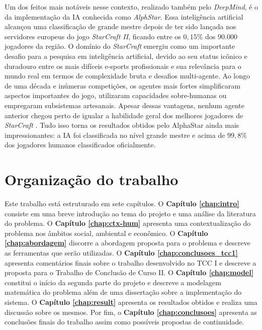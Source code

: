 Um dos feitos mais notáveis nesse contexto, realizado também pelo \textit{DeepMind}, é o da implementação da IA conhecida como \textit{AlphStar}. Essa inteligência artificial alcançou uma classificação de grande mestre depois de ter sido lançada nos servidores europeus do jogo \textit{StarCraft II}, ficando entre os $0,15\%$ dos 90.000 jogadores da região. O domínio do \textit{StarCraft} emergiu como um importante desafio para a pesquisa em inteligência artificial, devido ao seu status icônico e duradouro entre os mais difíceis e-sports profissionais e sua relevância para o mundo real em termos de complexidade bruta e desafios multi-agente. Ao longo de uma década e inúmeras competições, os agentes mais fortes simplificaram aspectos importantes do jogo, utilizaram capacidades sobre-humanas ou empregaram subsistemas artesanais. Apesar dessas vantagens, nenhum agente anterior chegou perto de igualar a habilidade geral dos melhores jogadores de \textit{StarCraft} \cite{vinyals:gm-lv-starcraft}. Tudo isso torna os resultados obtidos pelo AlphaStar ainda mais impressionantes: a IA foi classificada no nível grande mestre e acima de $99,8\%$ dos jogadores humanos classificados oficialmente.




\section{Organização do trabalho} %
\label{sec:organização_do_trabalho}
Este trabalho está estruturado em sete capítulos. O \textbf{Capítulo \ref{chap:intro}} consiste em uma breve introdução ao tema do projeto e uma análise da literatura do problema. O \textbf{Capítulo \ref{chap:ctx-hum}} apresenta uma contextualização do problema nos âmbitos social, ambiental e econômico. O \textbf{Capítulo \ref{chap:abordagem}} discorre a abordagem proposta para o problema e descreve as ferramentas que serão utilizadas. 
O \textbf{Capítulo \ref{chap:conclusoes_tcc1}} apresenta comentários finais sobre o trabalho desenvolvido no TCC I e descreve a proposta para o Trabalho de Conclusão de Curso II. 
O \textbf{Capítulo \ref{chap:model}} constitui o início da segunda parte do projeto e descreve a modelagem matemática do problema além de uma dissertação sobre a implementação do sistema. O \textbf{Capítulo \ref{chap:result}} apresenta os resultados obtidos e realiza uma discussão sobre os mesmos. Por fim, o \textbf{Capítulo \ref{chap:conclusoes}} apresenta as conclusões finais do trabalho assim como possíveis propostas de continuidade.




